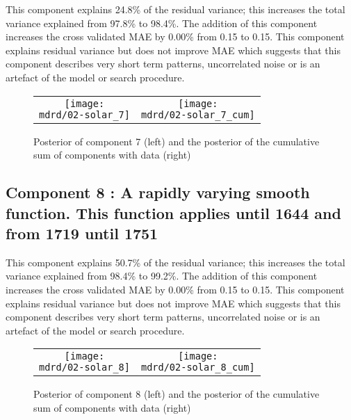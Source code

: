 \documentclass{article} %
\begin{document}


This component explains 24.8\% of the residual variance; this increases the total variance explained from 97.8\% to 98.4\%.
The addition of this component increases the cross validated MAE by 0.00\% from 0.15 to 0.15.
This component explains residual variance but does not improve MAE which suggests that this component describes very short term patterns, uncorrelated noise or is an artefact of the model or search procedure.

\begin{figure}[H]
\newcommand{\wmgd}{0.5\columnwidth}
\newcommand{\hmgd}{3.0cm}
\newcommand{\mdrd}{figures/02-solar}
\newcommand{\mbm}{\hspace{-0.3cm}}
\begin{tabular}{cc}
\mbm \texttt{[image: \\mdrd/02-solar\_7]} & \texttt{[image: \\mdrd/02-solar\_7\_cum]}
\end{tabular}
\caption{Posterior of component 7 (left) and the posterior of the cumulative sum of components with data (right)}
\label{fig:comp7}
\end{figure}

\subsection{Component 8 : A rapidly varying smooth function. This function applies until 1644 and from 1719 until 1751}



This component explains 50.7\% of the residual variance; this increases the total variance explained from 98.4\% to 99.2\%.
The addition of this component increases the cross validated MAE by 0.00\% from 0.15 to 0.15.
This component explains residual variance but does not improve MAE which suggests that this component describes very short term patterns, uncorrelated noise or is an artefact of the model or search procedure.

\begin{figure}[H]
\newcommand{\wmgd}{0.5\columnwidth}
\newcommand{\hmgd}{3.0cm}
\newcommand{\mdrd}{figures/02-solar}
\newcommand{\mbm}{\hspace{-0.3cm}}
\begin{tabular}{cc}
\mbm \texttt{[image: \\mdrd/02-solar\_8]} & \texttt{[image: \\mdrd/02-solar\_8\_cum]}
\end{tabular}
\caption{Posterior of component 8 (left) and the posterior of the cumulative sum of components with data (right)}
\label{fig:comp8}
\end{figure}
\end{document}
